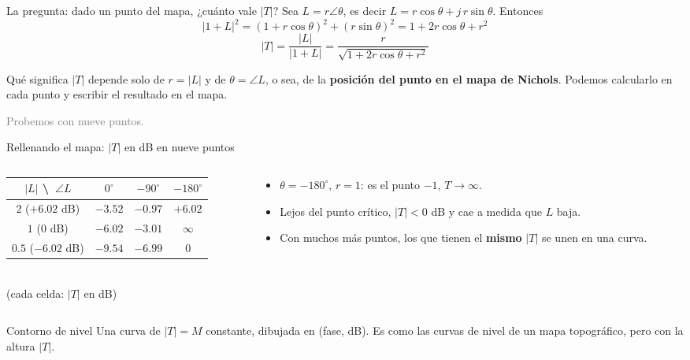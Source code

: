 \documentclass[aspectratio=169,11pt]{beamer}
\begin{document}
\begin{frame}{La pregunta: dado un punto del mapa, ¿cuánto vale $|T|$?}
  \small
  Sea $L=r\angle\theta$, es decir $L=r\cos\theta+j\,r\sin\theta$. Entonces
  \[ |1+L|^2=(1+r\cos\theta)^2+(r\sin\theta)^2=1+2r\cos\theta+r^2 \]
  \[ \boxed{\;|T|=\frac{|L|}{|1+L|}=\frac{r}{\sqrt{1+2r\cos\theta+r^2}}\;} \]
  \begin{block}{Qué significa}
    $|T|$ depende solo de $r=|L|$ y de $\theta=\angle L$, o sea, de la \textbf{posición del punto en el mapa de Nichols}. Podemos calcularlo en cada punto y escribir el resultado en el mapa.
  \end{block}
  \textcolor{gray}{Probemos con nueve puntos.}
\end{frame}

\begin{frame}{Rellenando el mapa: $|T|$ en dB en nueve puntos}
  \small
  \begin{columns}[T]
  \begin{column}{0.56\textwidth}
    \centering
    \begin{tabular}{c|c|c|c}
      $|L|$ \textbackslash\ $\angle L$ & $0^\circ$ & $-90^\circ$ & $-180^\circ$\\\hline
      $2$ ($+6.02$ dB) & $-3.52$ & $-0.97$ & $+6.02$\\
      $1$ ($0$ dB) & $-6.02$ & $-3.01$ & $\infty$\\
      $0.5$ ($-6.02$ dB) & $-9.54$ & $-6.99$ & $0$
    \end{tabular}
    \vspace{4pt}\\
    {\footnotesize (cada celda: $|T|$ en dB)}
  \end{column}
  \begin{column}{0.42\textwidth}
    \begin{itemize}
      \item $\theta=-180^\circ$, $r=1$: es el punto $-1$, $T\to\infty$.
      \item Lejos del punto crítico, $|T|<0$ dB y cae a medida que $L$ baja.
      \item Con muchos más puntos, los que tienen el \textbf{mismo} $|T|$ se unen en una curva.
    \end{itemize}
  \end{column}
  \end{columns}
  \begin{block}{Contorno de nivel}
    Una curva de $|T|=M$ constante, dibujada en (fase, dB). Es como las curvas de nivel de un mapa topográfico, pero con la altura $|T|$.
  \end{block}
\end{frame}
\end{document}
